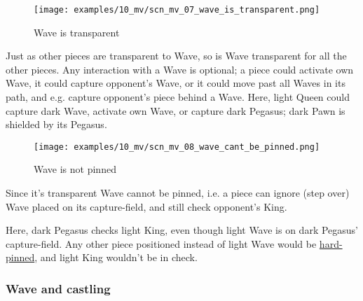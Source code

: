 \vspace*{-1.4\baselineskip}
\noindent
\begin{figure}[!h]
\texttt{[image: examples/10\_mv/scn\_mv\_07\_wave\_is\_transparent.png]}
\vspace*{-1.4\baselineskip}
\caption{Wave is transparent}
\label{fig:scn_mv_07_wave_is_transparent}
\end{figure}

\vspace*{-0.5\baselineskip}
Just as other pieces are transparent to Wave, so is Wave transparent for all the
other pieces. Any interaction with a Wave is optional; a piece could activate own
Wave, it could capture opponent's Wave, or it could move past all Waves in its path,
and e.g. capture opponent's piece behind a Wave.\newline
\indent
Here, light Queen could capture dark Wave, activate own Wave, or capture dark
Pegasus; dark Pawn is shielded by its Pegasus.

\clearpage %

\vspace*{-2.1\baselineskip}
\noindent
\begin{figure}[!h]
\texttt{[image: examples/10\_mv/scn\_mv\_08\_wave\_cant\_be\_pinned.png]}
\vspace*{-1.3\baselineskip}
\caption{Wave is not pinned}
\label{fig:scn_mv_08_wave_cant_be_pinned}
\end{figure}

\vspace*{-0.5\baselineskip}
Since it's transparent Wave cannot be pinned, i.e. a piece can ignore (step over)
Wave placed on its capture-field, and still check opponent's King.

Here, dark Pegasus checks light King, even though light Wave is on dark Pegasus'
capture-field. Any other piece positioned instead of light Wave would be
\href{https://en.wikipedia.org/wiki/Pin_(chess)#Absolute_pin}{hard-pinned},
and light King wouldn't be in check.

\clearpage %

\subsubsection*{Wave and castling}
\label{sec:Miranda's veil/Wave/Cascading Waves/Wave and castling}

